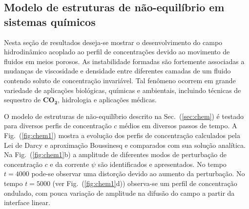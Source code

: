 \documentclass[a4paper,portuges,12pt]{article}
\begin{document}
\subsection{Modelo de estruturas de não-equilíbrio em sistemas químicos}

Nesta seção de resultados deseja-se mostrar o desenvolvimento do campo
hidrodinâmico acoplado ao perfil de concentrações devido ao movimento de
fluidos em meios porosos. As instabilidade formadas são fortemente
associadas a mudanças de viscosidade e densidade entre diferentes
camadas de um fluido contendo soluto de concentração invariável. Tal
fenômeno ocorrem em grande variedade de aplicações biológicas, químicas
e ambientais, incluindo técnicas de sequestro de $\mathbf{CO_2}$,
hidrologia e aplicações médicas. 

O modelo de estruturas de não-equilíbrio descrito na
Sec.~(\ref{sec:chem}) é testado para diversos perfis de concentração $c$
médios em diversos passos de tempo. A Fig.~(\ref{fig:chem1}) mostra a
evolução dos perfis de concentração calculados pela Lei de Darcy e
aproximação Boussinesq e comparados com sua solução analítica. Na
Fig.~(\ref{fig:chem1}b) a amplitude de diferentes modos de perturbação
de concentração $c$ e da corrente $\psi$ são identificados e
apresentados. No tempo $t=4000$ pode-se observar uma distorção devido ao
aumento da perturbação. No tempo $t=5000$ (ver Fig.~(\ref{fig:chem1}d))
observa-se um perfil de concentração ondulado, com pouca variação de
amplitude na difusão do campo a partir da interface linear. 
\end{document}
